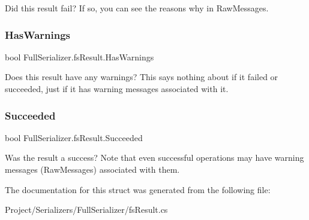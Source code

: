 Did this result fail? If so, you can see the reasons why in {\ttfamily Raw\+Messages}. 

\mbox{\label{struct_full_serializer_1_1fs_result_a44ec04b6b1e0834f87fd82a10b120f71}} 
\subsubsection{\texorpdfstring{Has\+Warnings}{HasWarnings}}
{\footnotesize\ttfamily bool Full\+Serializer.\+fs\+Result.\+Has\+Warnings\hspace{0.3cm}{\ttfamily [get]}}



Does this result have any warnings? This says nothing about if it failed or succeeded, just if it has warning messages associated with it. 

\mbox{\label{struct_full_serializer_1_1fs_result_a09d500a429685b79bec14453423af551}} 
\subsubsection{\texorpdfstring{Succeeded}{Succeeded}}
{\footnotesize\ttfamily bool Full\+Serializer.\+fs\+Result.\+Succeeded\hspace{0.3cm}{\ttfamily [get]}}



Was the result a success? Note that even successful operations may have warning messages ({\ttfamily Raw\+Messages}) associated with them. 



The documentation for this struct was generated from the following file\+:\begin{DoxyCompactItemize}
\item 
Project/\+Serializers/\+Full\+Serializer/fs\+Result.\+cs\end{DoxyCompactItemize}
